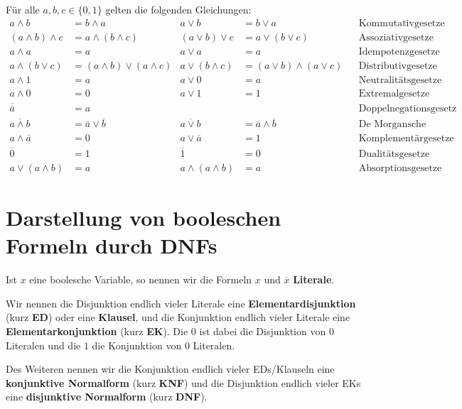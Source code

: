 \begin{prop}
	Für alle $a,b,c \in \{0,1\}$ gelten die folgenden Gleichungen: 
	\footnotesize
		\begin{align*}
			a \wedge b & = b \wedge a &  a \vee b & = b \vee a & & \text{Kommutativgesetze} 
			\\ (a \wedge b) \wedge c & = a \wedge (b \wedge c) &  (a \vee b) \vee c& = a \vee (b \vee c) & & \text{Assoziativgesetze} 
			\\ a \wedge a & = a  & a \vee a & = a  & & \text{Idempotenzgesetze} 
			\\ a \wedge (b \vee c) & = (a \wedge b) \vee (a \wedge c) &  a \vee (b \wedge c) & = (a \vee b) \wedge (a \vee c)  && \text{Distributivgesetze} 
			\\ a \wedge 1 & = a  & a \vee 0 & = a  & & \text{Neutralitätsgesetze} 
			\\ a \wedge 0 & = 0 &  a \vee 1 & = 1 & & \text{Extremalgesetze} 
			\\ \overline{\overline{a}} & = a & & & & \text{Doppelnegationsgesetz}			
			\\ \overline{a \wedge b} & = \overline{a} \vee \overline{b}  & \overline{a \vee b} & = \overline{a} \wedge \overline{b} & & \text{De Morgansche Gesetze} 
			\\ a \wedge \overline{a} & = 0  & a \vee \overline{a} & = 1 & & \text{Komplementärgesetze}
			\\ \overline{0} & = 1 & \overline{1} & = 0 & & \text{Dualitätsgesetze} 
			\\ a \vee (a \wedge b) & = a & a \wedge (a \wedge b) & = a & & \text{Absorptionsgesetze}
		\end{align*} 
\end{prop} 





\section{Darstellung von booleschen Formeln durch DNFs} 

\begin{defn}
	Ist $x$ eine boolesche Variable, so nennen wir die Formeln $x$ und $\overline{x}$ \textbf{Literale}. 
	
	Wir nennen die Disjunktion endlich vieler Literale eine \textbf{Elementardisjunktion} (kurz \textbf{ED}) oder eine \textbf{Klausel}, und die Konjunktion endlich vieler Literale eine \textbf{Elementarkonjunktion} (kurz \textbf{EK}).  Die $0$ ist dabei die Disjunktion von $0$ Literalen und die $1$ die Konjunktion von $0$ Literalen. 
	
	Des Weiteren nennen wir die Konjunktion endlich vieler EDs/Klauseln eine \textbf{konjunktive Normalform} (kurz \textbf{KNF}) und die Disjunktion endlich vieler EKs eine \textbf{disjunktive Normalform} (kurz \textbf{DNF}). 
\end{defn} 


